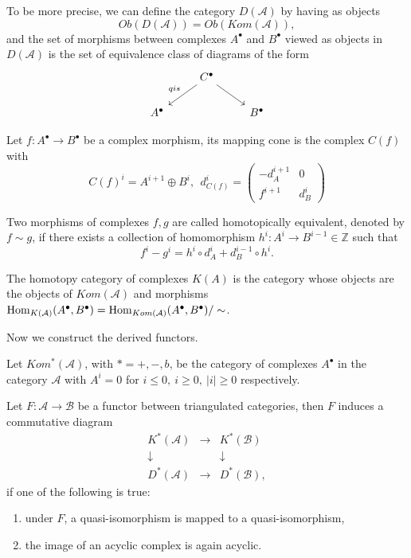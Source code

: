 \documentclass[
	oldfontcommands,
	sumario=abnt-6027-2012,
	12pt,			%
	openright,		%
	oneside,		%
	a4paper,		%
	english,		%
	brazil			%
	]{imecc-unicamp}
\begin{document}
To be more precise, we can define the category $D(\mathcal A)$ by having as objects $$
Ob(D(\mathcal A))=Ob(Kom(\mathcal A)),
$$ 
and the set of morphisms between complexes $A^\bullet$ and $B^\bullet$ viewed as objects in $D(\mathcal A)$ is the set of equivalence class of diagrams of the form $$
\begin{tikzcd}
& C^\bullet \arrow[ld, "qis"'] \arrow[rd] &           \\
A^\bullet &                                         & B^\bullet
\end{tikzcd}
$$
\begin{definition}
	Let $f:A^\bullet \rightarrow B^\bullet$ be a complex morphism, its mapping cone is the complex $C(f)$ with $$
	C(f)^i=A^{i+1}\oplus B^i,~~ d^i_{C(f)}=\left( {\begin{array}{cc}
		-d^{i+1}_A&0\\
		f^{i+1}&d^i_B
		\end{array} } \right)	
	$$
\end{definition}
\begin{definition}
	Two morphisms of complexes $f,g$ are called homotopically equivalent, denoted by $f\sim g$, if there exists a collection of homomorphism $h^i:A^i\rightarrow B^{i-1}\in \mathbb Z$ such that $$
	f^i-g^i=h^i\circ d^i_A + d^{i-1}_B\circ h^i.
	$$
	
	The homotopy category of complexes $K(A)$ is the category whose objects are the objects of $Kom(\mathcal A)$ and morphisms $\operatorname{Hom}_{K(\mathcal A)}(A^\bullet, B^\bullet)=\operatorname{Hom}_{Kom(\mathcal A)}(A^\bullet, B^\bullet)/\sim$.
\end{definition}

Now we construct the derived functors.

\begin{definition}
	Let $Kom^*(\mathcal A)$, with $*=+,-,b$, be the category of complexes $A^\bullet$ in the category $\mathcal A$ with $A^i=0$ for $i\le 0, ~i\geq0,~|i|\geq0$ respectively. 
\end{definition}

\begin{lema}
	Let $F:\mathcal A\rightarrow \mathcal B$ be a functor between triangulated categories, then $F$ induces a commutative diagram $$
	\begin{matrix}
	K^*(\mathcal A)&\rightarrow &K^*(\mathcal B)\\
	\downarrow&&\downarrow\\
	D^*(\mathcal A)&\rightarrow &D^*(\mathcal B),
	\end{matrix}
	$$
	if one of the following is true:
	\begin{enumerate}
		\item under $F$, a quasi-isomorphism is mapped to a quasi-isomorphism,
		\item the image of an acyclic complex is again acyclic.
	\end{enumerate}
	
\end{lema}
\end{document}
